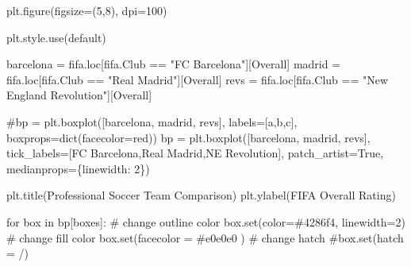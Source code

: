 \documentclass[
  letterpaper,
  DIV=11,
  numbers=noendperiod]{scrreprt}
\newenvironment{Shaded}{\begin{snugshade}}{\end{snugshade}}
\newcommand{\BuiltInTok}[1]{\textcolor[rgb]{0.00,0.23,0.31}{#1}}
\newcommand{\CommentTok}[1]{\textcolor[rgb]{0.37,0.37,0.37}{#1}}
\newcommand{\ControlFlowTok}[1]{\textcolor[rgb]{0.00,0.23,0.31}{#1}}
\newcommand{\DecValTok}[1]{\textcolor[rgb]{0.68,0.00,0.00}{#1}}
\newcommand{\KeywordTok}[1]{\textcolor[rgb]{0.00,0.23,0.31}{#1}}
\newcommand{\NormalTok}[1]{\textcolor[rgb]{0.00,0.23,0.31}{#1}}
\newcommand{\OperatorTok}[1]{\textcolor[rgb]{0.37,0.37,0.37}{#1}}
\newcommand{\StringTok}[1]{\textcolor[rgb]{0.13,0.47,0.30}{#1}}
\newcommand{\VariableTok}[1]{\textcolor[rgb]{0.07,0.07,0.07}{#1}}
\begin{document}
\begin{Shaded}
\begin{Highlighting}[]
\NormalTok{plt.figure(figsize}\OperatorTok{=}\NormalTok{(}\DecValTok{5}\NormalTok{,}\DecValTok{8}\NormalTok{), dpi}\OperatorTok{=}\DecValTok{100}\NormalTok{)}

\NormalTok{plt.style.use(}\StringTok{\textquotesingle{}default\textquotesingle{}}\NormalTok{)}

\NormalTok{barcelona }\OperatorTok{=}\NormalTok{ fifa.loc[fifa.Club }\OperatorTok{==} \StringTok{"FC Barcelona"}\NormalTok{][}\StringTok{\textquotesingle{}Overall\textquotesingle{}}\NormalTok{]}
\NormalTok{madrid }\OperatorTok{=}\NormalTok{ fifa.loc[fifa.Club }\OperatorTok{==} \StringTok{"Real Madrid"}\NormalTok{][}\StringTok{\textquotesingle{}Overall\textquotesingle{}}\NormalTok{]}
\NormalTok{revs }\OperatorTok{=}\NormalTok{ fifa.loc[fifa.Club }\OperatorTok{==} \StringTok{"New England Revolution"}\NormalTok{][}\StringTok{\textquotesingle{}Overall\textquotesingle{}}\NormalTok{]}

\CommentTok{\#bp = plt.boxplot([barcelona, madrid, revs], labels=[\textquotesingle{}a\textquotesingle{},\textquotesingle{}b\textquotesingle{},\textquotesingle{}c\textquotesingle{}], boxprops=dict(facecolor=\textquotesingle{}red\textquotesingle{}))}
\NormalTok{bp }\OperatorTok{=}\NormalTok{ plt.boxplot([barcelona, madrid, revs], tick\_labels}\OperatorTok{=}\NormalTok{[}\StringTok{\textquotesingle{}FC Barcelona\textquotesingle{}}\NormalTok{,}\StringTok{\textquotesingle{}Real Madrid\textquotesingle{}}\NormalTok{,}\StringTok{\textquotesingle{}NE Revolution\textquotesingle{}}\NormalTok{], patch\_artist}\OperatorTok{=}\VariableTok{True}\NormalTok{, medianprops}\OperatorTok{=}\NormalTok{\{}\StringTok{\textquotesingle{}linewidth\textquotesingle{}}\NormalTok{: }\DecValTok{2}\NormalTok{\})}

\NormalTok{plt.title(}\StringTok{\textquotesingle{}Professional Soccer Team Comparison\textquotesingle{}}\NormalTok{)}
\NormalTok{plt.ylabel(}\StringTok{\textquotesingle{}FIFA Overall Rating\textquotesingle{}}\NormalTok{)}

\ControlFlowTok{for}\NormalTok{ box }\KeywordTok{in}\NormalTok{ bp[}\StringTok{\textquotesingle{}boxes\textquotesingle{}}\NormalTok{]:}
    \CommentTok{\# change outline color}
\NormalTok{    box.}\BuiltInTok{set}\NormalTok{(color}\OperatorTok{=}\StringTok{\textquotesingle{}\#4286f4\textquotesingle{}}\NormalTok{, linewidth}\OperatorTok{=}\DecValTok{2}\NormalTok{)}
    \CommentTok{\# change fill color}
\NormalTok{    box.}\BuiltInTok{set}\NormalTok{(facecolor }\OperatorTok{=} \StringTok{\textquotesingle{}\#e0e0e0\textquotesingle{}}\NormalTok{ )}
    \CommentTok{\# change hatch}
    \CommentTok{\#box.set(hatch = \textquotesingle{}/\textquotesingle{})}
\end{Highlighting}
\end{Shaded}
\end{document}
